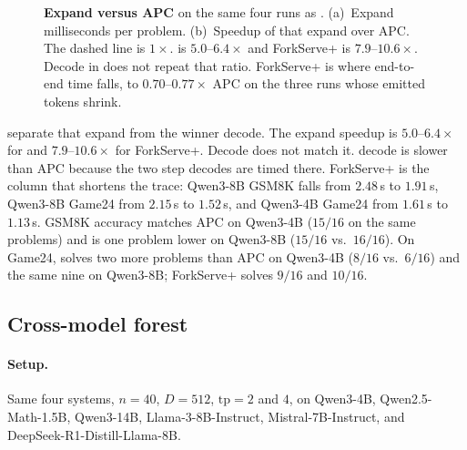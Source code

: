 \begin{figure}[t]
\centering
\resizebox{\columnwidth}{!}{}
\caption{\textbf{Expand versus APC} on the same four runs as .
(a)~Expand milliseconds per problem.
(b)~Speedup of that expand over APC. The dashed line is $1\times$.
\sys is $5.0$--$6.4\times$ and ForkServe+ is $7.9$--$10.6\times$.
Decode in  does not repeat that ratio.
ForkServe+ is where end-to-end time falls, to $0.70$--$0.77\times$ APC on the three runs whose emitted tokens shrink.}
\label{fig:eval-mt-split}
\end{figure}

 separate that expand from the winner decode.
The expand speedup is $5.0$--$6.4\times$ for \sys and $7.9$--$10.6\times$ for ForkServe+.
Decode does not match it.
\sys decode is slower than APC because the two step decodes are timed there.
ForkServe+ is the column that shortens the trace: Qwen3-8B GSM8K falls from $2.48$\,s to $1.91$\,s, Qwen3-8B Game24 from $2.15$\,s to $1.52$\,s, and Qwen3-4B Game24 from $1.61$\,s to $1.13$\,s.
GSM8K accuracy matches APC on Qwen3-4B ($15/16$ on the same problems) and is one problem lower on Qwen3-8B ($15/16$ vs.\ $16/16$).
On Game24, \sys solves two more problems than APC on Qwen3-4B ($8/16$ vs.\ $6/16$) and the same nine on Qwen3-8B; ForkServe+ solves $9/16$ and $10/16$.

\subsection{Cross-model forest}
\label{sec:eval-multi}

\paragraph{Setup.}
Same four systems, $n{=}40$, $D{=}512$, $\mathrm{tp}{=}2$ and $4$, on Qwen3-4B, Qwen2.5-Math-1.5B, Qwen3-14B, Llama-3-8B-Instruct, Mistral-7B-Instruct, and DeepSeek-R1-Distill-Llama-8B.

